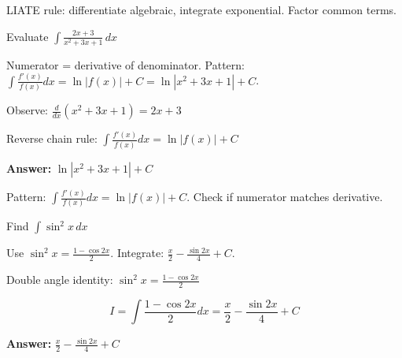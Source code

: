 \begin{takeaways}
LIATE rule: differentiate algebraic, integrate exponential. Factor common terms.
\end{takeaways}

\vspace{1cm}

\begin{problem}
Evaluate $\displaystyle \int \frac{2x + 3}{x^2 + 3x + 1} \, dx$
\end{problem}

\begin{hint}
Numerator = derivative of denominator. Pattern: $\int \frac{f'(x)}{f(x)} dx = \ln|f(x)| + C = \ln|x^2 + 3x + 1| + C$.
\end{hint}

\begin{solution}
Observe: $\frac{d}{dx}(x^2+3x+1) = 2x+3$

Reverse chain rule: $\displaystyle \int \frac{f'(x)}{f(x)}dx = \ln|f(x)| + C$

\textbf{Answer:} $\boxed{\ln|x^2+3x+1| + C}$
\end{solution}

\begin{takeaways}
Pattern: $\int \frac{f'(x)}{f(x)}dx = \ln|f(x)| + C$. Check if numerator matches derivative.
\end{takeaways}

\vspace{1cm}

\begin{problem}
Find $\displaystyle \int \sin^2 x \, dx$
\end{problem}

\begin{hint}
Use $\sin^2 x = \frac{1 - \cos 2x}{2}$. Integrate: $\frac{x}{2} - \frac{\sin 2x}{4} + C$.
\end{hint}

\begin{solution}
Double angle identity: $\sin^2 x = \frac{1-\cos 2x}{2}$

\[
I = \int \frac{1-\cos 2x}{2}dx = \frac{x}{2} - \frac{\sin 2x}{4} + C
\]

\textbf{Answer:} $\boxed{\frac{x}{2} - \frac{\sin 2x}{4} + C}$
\end{solution}

